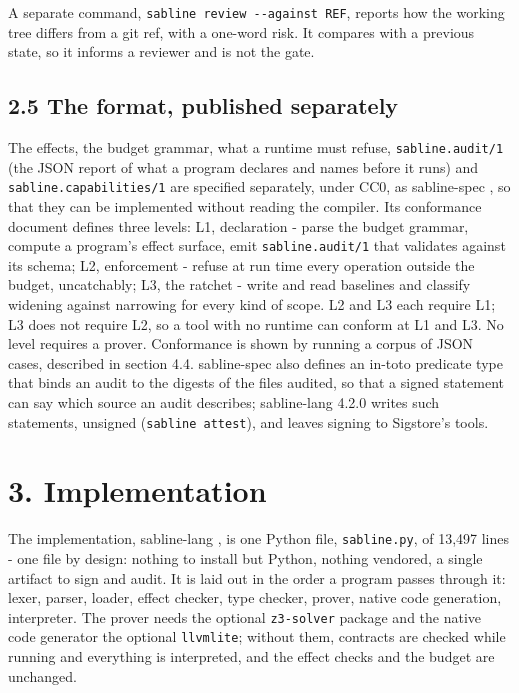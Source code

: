 \documentclass[
]{article}
\begin{document}
A separate command, \texttt{sabline\ review\ -\/-against\ REF}, reports
how the working tree differs from a git ref, with a one-word risk. It
compares with a previous state, so it informs a reviewer and is not the
gate.

\subsection{2.5 The format, published
separately}\label{the-format-published-separately}

The effects, the budget grammar, what a runtime must refuse,
\texttt{sabline.audit/1} (the JSON report of what a program declares and
names before it runs) and \texttt{sabline.capabilities/1} are specified
separately, under CC0, as sabline-spec \citep{sabline_spec}, so that
they can be implemented without reading the compiler. Its conformance
document defines three levels: L1, declaration - parse the budget
grammar, compute a program's effect surface, emit
\texttt{sabline.audit/1} that validates against its schema; L2,
enforcement - refuse at run time every operation outside the budget,
uncatchably; L3, the ratchet - write and read baselines and classify
widening against narrowing for every kind of scope. L2 and L3 each
require L1; L3 does not require L2, so a tool with no runtime can
conform at L1 and L3. No level requires a prover. Conformance is shown
by running a corpus of JSON cases, described in section 4.4.
sabline-spec also defines an in-toto predicate type that binds an audit
to the digests of the files audited, so that a signed statement can say
which source an audit describes; sabline-lang 4.2.0 writes such
statements, unsigned (\texttt{sabline\ attest}), and leaves signing to
Sigstore's tools.

\section{3. Implementation}\label{implementation}

The implementation, sabline-lang \citep{sabline_lang}, is one Python
file, \texttt{sabline.py}, of 13,497 lines - one file by design: nothing
to install but Python, nothing vendored, a single artifact to sign and
audit. It is laid out in the order a program passes through it: lexer,
parser, loader, effect checker, type checker, prover, native code
generation, interpreter. The prover needs the optional
\texttt{z3-solver} package and the native code generator the optional
\texttt{llvmlite}; without them, contracts are checked while running and
everything is interpreted, and the effect checks and the budget are
unchanged.
\end{document}
